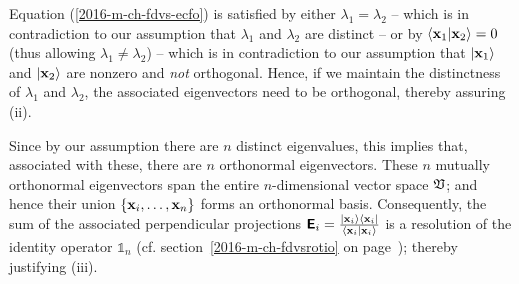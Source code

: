 {Equation (\ref{2016-m-ch-fdvs-ecfo}) is satisfied by
either $\lambda_1  = \lambda_2$
--
which is in contradiction to our assumption that $\lambda_1$ and $\lambda_2$ are distinct
--
or by  $\langle {\bf x}_1 \vert {\bf x}_2 \rangle =0$  (thus allowing $\lambda_1  \neq \lambda_2$) --
which is in contradiction to our assumption that $\vert {\bf x}_1\rangle$ and $\vert  {\bf x}_2\rangle$
are nonzero and {\em not} orthogonal.
Hence, if we maintain the distinctness of $\lambda_1$ and $\lambda_2$, the associated eigenvectors need to be orthogonal,
thereby assuring (ii).

Since by our assumption there are $n$ distinct eigenvalues, this implies that, associated with these,
there are $n$ orthonormal eigenvectors.
These $n$ mutually orthonormal eigenvectors
span the entire $n$-dimensional vector space $\frak V$;
and hence their union $\{  {\bf x}_i, \ldots ,   {\bf x}_n\}$ forms an orthonormal basis.
Consequently, the sum of the associated perpendicular projections
$\textsf{\textbf{E}}_i = \frac{\vert {\bf x}_i \rangle \langle {\bf x}_i \vert}{\langle {\bf x}_i \vert {\bf x}_i  \rangle}$
is a resolution of the identity operator $\mathbb{1}_n$
(cf. section~\ref{2016-m-ch-fdvsrotio} on page~\pageref{2016-m-ch-fdvsrotio}); thereby justifying (iii).

}
